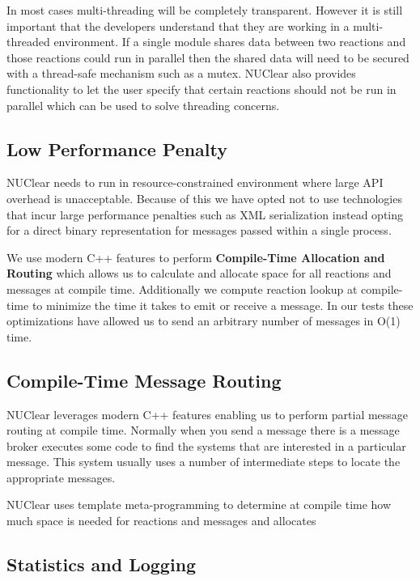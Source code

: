 \documentclass[english,12pt]{scrartcl}
\begin{document}
			In most cases multi-threading will be completely transparent. 
			However it is still important that the developers understand that they are working in a multi-threaded environment.
			If a single module shares data between two reactions and those reactions could run in parallel then the shared data will
			need to be secured with a thread-safe mechanism such as a mutex.
			NUClear also provides functionality to let the user specify that certain reactions should not be run in parallel which can be used to solve threading concerns.
		
		\subsection{Low Performance Penalty}
			NUClear needs to run in resource-constrained environment where large API overhead is unacceptable.
			Because of this we have opted not to use technologies that incur large performance penalties such as XML serialization 
			instead opting for a direct binary representation for messages passed within a single process. 
			
			We use modern C++ features to perform \textbf{Compile-Time Allocation and Routing} which allows us to calculate and allocate space
			for all reactions and messages at compile time.
			Additionally we compute reaction lookup at compile-time to minimize the time it takes to emit or receive a message.
			In our tests these optimizations have allowed us to send an arbitrary number of messages in O(1) time.
			

			
		\subsection{Compile-Time Message Routing}
			NUClear leverages modern C++ features enabling us to perform partial message routing at compile time.
			Normally when you send a message there is a message broker executes some code to find the systems that are interested in a particular message.
			This system usually uses a number of intermediate steps to locate the appropriate messages.
			
			NUClear uses template meta-programming to determine at compile time how much space is needed for reactions and messages and allocates
			
			
		\subsection{Statistics and Logging}
			
\end{document}
